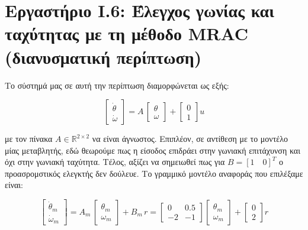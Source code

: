 \documentclass{article}
\begin{document}
    
    \section{Εργαστήριο I.6: Έλεγχος γωνίας και ταχύτητας με τη μέθοδο MRAC (διανυσματική περίπτωση)}
    Το σύστημά μας σε αυτή την περίπτωση διαμορφώνεται ως εξής:
    
    \begin{equation*}
        \begin{bmatrix}
            \dot{\theta} \\
            \dot{\omega}
        \end{bmatrix} = 
        A\,
        \begin{bmatrix}
            \theta \\
            \omega
        \end{bmatrix} +
        \begin{bmatrix}
            0 \\
            1
        \end{bmatrix}u
    \end{equation*}
    
    \noindent
    με τον πίνακα \(A \in \mathbb{R}^{2\times2}\) να είναι άγνωστος. Επιπλέον, σε αντίθεση με το μοντέλο μίας μεταβλητής, εδώ θεωρούμε πως η είσοδος επιδράει στην γωνιακή επιτάχυνση και όχι στην γωνιακή ταχύτητα. Τέλος, αξίζει να σημειωθεί πως για $B = [1 \quad 0]^T$ ο προασρομστικός ελεγκτής δεν δούλευε. Το γραμμικό μοντέλο αναφοράς που επιλέξαμε είναι:

    \begin{equation*}
        \begin{bmatrix}
            \dot{\theta}_m \\
            \dot{\omega}_m
        \end{bmatrix} = 
        A_m\,
        \begin{bmatrix}
            \theta_m \\
            \omega_m
        \end{bmatrix} +
        B_m\,r
        = 
        \begin{bmatrix}
            0 & 0.5 \\
            -2 & -1
        \end{bmatrix}
        \begin{bmatrix}
            \theta_m \\
            \omega_m
        \end{bmatrix} +
        \begin{bmatrix}
            0 \\
            2
        \end{bmatrix}r
    \end{equation*}
\end{document}
